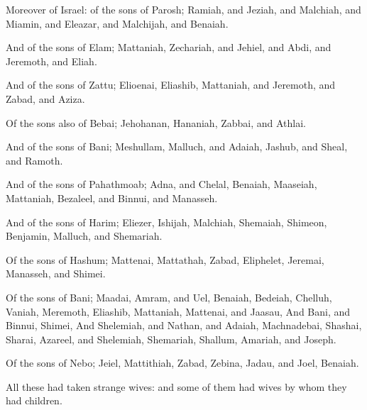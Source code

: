 \verse Moreover of Israel: of the sons of Parosh; Ramiah, and Jeziah, and Malchiah, and Miamin, and Eleazar, and Malchijah, and Benaiah.

\verse And of the sons of Elam; Mattaniah, Zechariah, and Jehiel, and Abdi, and Jeremoth, and Eliah.

\verse And of the sons of Zattu; Elioenai, Eliashib, Mattaniah, and Jeremoth, and Zabad, and Aziza.

\verse Of the sons also of Bebai; Jehohanan, Hananiah, Zabbai, and Athlai.

\verse And of the sons of Bani; Meshullam, Malluch, and Adaiah, Jashub, and Sheal, and Ramoth.

\verse And of the sons of Pahathmoab; Adna, and Chelal, Benaiah, Maaseiah, Mattaniah, Bezaleel, and Binnui, and Manasseh.

\verse And of the sons of Harim; Eliezer, Ishijah, Malchiah, Shemaiah, Shimeon, \verse Benjamin, Malluch, and Shemariah.

\verse Of the sons of Hashum; Mattenai, Mattathah, Zabad, Eliphelet, Jeremai, Manasseh, and Shimei.

\verse Of the sons of Bani; Maadai, Amram, and Uel, \verse Benaiah, Bedeiah, Chelluh, \verse Vaniah, Meremoth, Eliashib, \verse Mattaniah, Mattenai, and Jaasau, \verse And Bani, and Binnui, Shimei, \verse And Shelemiah, and Nathan, and Adaiah, \verse Machnadebai, Shashai, Sharai, \verse Azareel, and Shelemiah, Shemariah, \verse Shallum, Amariah, and Joseph.

\verse Of the sons of Nebo; Jeiel, Mattithiah, Zabad, Zebina, Jadau, and Joel, Benaiah.

\verse All these had taken strange wives: and some of them had wives by whom they had children.

